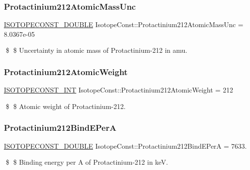 \subsubsection{\texorpdfstring{Protactinium212\+Atomic\+Mass\+Unc}{Protactinium212AtomicMassUnc}}
{\footnotesize\ttfamily \mbox{\hyperlink{group___isotope_const-_macros_ga8f45a7272ce02c0b4c65c44636ed719a}{I\+S\+O\+T\+O\+P\+E\+C\+O\+N\+S\+T\+\_\+\+D\+O\+U\+B\+LE}} Isotope\+Const\+::\+Protactinium212\+Atomic\+Mass\+Unc = 8.\+0367e-\/05}

\$ \$ Uncertainty in atomic mass of Protactinium-\/212 in amu. \mbox{\label{group___isotope_const-_protactinium-_pa212_gab0808915fbb114ea657ec5657615a8d1}} 
\subsubsection{\texorpdfstring{Protactinium212\+Atomic\+Weight}{Protactinium212AtomicWeight}}
{\footnotesize\ttfamily \mbox{\hyperlink{group___isotope_const-_macros_ga5f18360b3e99483a35c32d789e62621c}{I\+S\+O\+T\+O\+P\+E\+C\+O\+N\+S\+T\+\_\+\+I\+NT}} Isotope\+Const\+::\+Protactinium212\+Atomic\+Weight = 212}

\$ \$ Atomic weight of Protactinium-\/212. \mbox{\label{group___isotope_const-_protactinium-_pa212_ga63ef08d948d86c4f1384d289d53c72e0}} 
\subsubsection{\texorpdfstring{Protactinium212\+Bind\+E\+PerA}{Protactinium212BindEPerA}}
{\footnotesize\ttfamily \mbox{\hyperlink{group___isotope_const-_macros_ga8f45a7272ce02c0b4c65c44636ed719a}{I\+S\+O\+T\+O\+P\+E\+C\+O\+N\+S\+T\+\_\+\+D\+O\+U\+B\+LE}} Isotope\+Const\+::\+Protactinium212\+Bind\+E\+PerA = 7633.}

\$ \$ Binding energy per A of Protactinium-\/212 in keV. \mbox{\label{group___isotope_const-_protactinium-_pa212_ga7fd2efc46f520a320ce1b40266a03cff}} 
